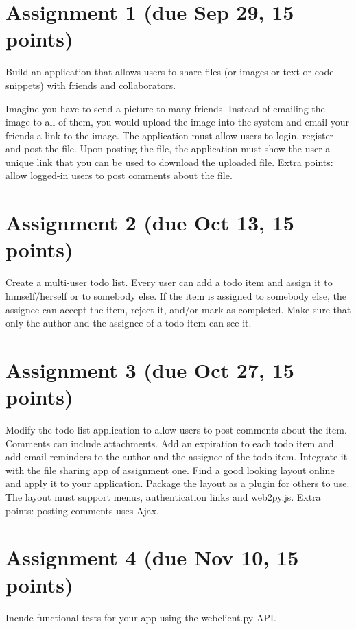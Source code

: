 \documentclass[12pt]{article}
\begin{document}
\section{Assignment 1 (due Sep 29, 15 points)}

Build an application that allows users to share files (or images or text or code snippets) with friends and collaborators. 

Imagine you have to send a picture to many friends. Instead of emailing the image to all of them, you would upload the image into the system and email your friends a link to the image. The application must allow users to login, register and post the file. Upon posting the file, the application must show the user a unique link that you can be used to download the uploaded file. Extra points: allow logged-in users to post comments about the file.

\section{Assignment 2 (due Oct 13, 15 points)}

Create a multi-user todo list. Every user can add a todo item and assign it to himself/herself or to somebody else. If the item is assigned to somebody else, the assignee can accept the item, reject it, and/or mark as completed. Make sure that only the author and the assignee of a todo item can see it.

\section{Assignment 3 (due Oct 27, 15 points)}

Modify the todo list application to allow users to post comments about the item. Comments can include attachments. Add an expiration to each todo item and add email reminders to the author and the assignee of the todo item. Integrate it with the file sharing app of assignment one. Find a good looking layout online and apply it to your application. Package the layout as a plugin for others to use. The layout must support menus, authentication links and web2py.js.  Extra points: posting comments uses Ajax.

\section{Assignment 4 (due Nov 10, 15 points)}

Incude functional tests for your app using the webclient.py API.
\end{document}
